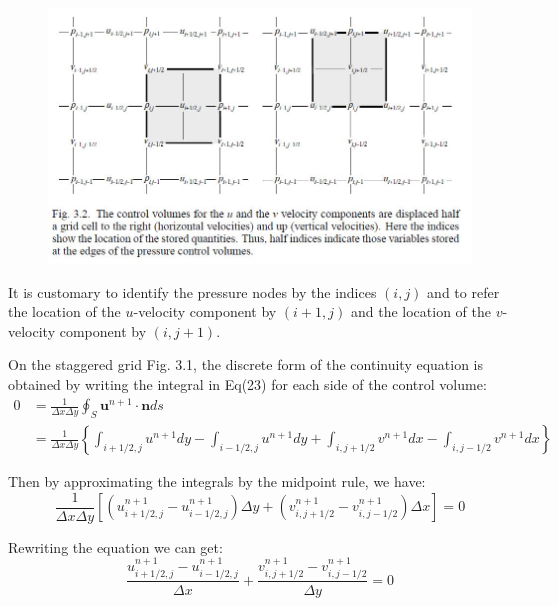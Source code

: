 \documentclass[11pt]{article} %
\begin{document}
\begin{figure}[h]
\includegraphics[scale=0.6]{staggered mesh 3.2.JPG}
\centering
\end{figure}
\par
It is customary to identify the pressure nodes by the indices $(i, j)$ and to refer the location of the $u$-velocity component by $(i+1, j)$ and the location of the $v$-velocity component by $(i, j+1)$. \par
On the staggered grid Fig. 3.1, the discrete form of the continuity equation is obtained by writing the integral in Eq(23) for each side of the control volume:
\begin{equation}
\begin{aligned}
0 &=\frac{1}{\Delta x\Delta y} \oint_{S} \textbf{u}^{n+1} \cdot \textbf{n} ds \\ 
&= \frac{1}{\Delta x\Delta y} \left\{
\int_{i+1/2, j} u^{n+1}dy -\int_{i-1/2, j} u^{n+1}dy+\int_{i, j+1/2} v^{n+1}dx-\int_{i, j-1/2} v^{n+1}dx
 \right\}
\end{aligned}
\end{equation}\par
Then by approximating the integrals by the midpoint rule, we have:
\begin{equation}
\frac{1}{\Delta x\Delta y} \left[\left(u_{i+1/2, j}^{n+1}-u_{i-1/2, j}^{n+1}\right)\Delta y +\left(v_{i, j+1/2}^{n+1}-v_{i, j-1/2}^{n+1}\right)\Delta x\right] = 0
\end{equation}\par
Rewriting the equation we can get:
\begin{equation}
\frac{u_{i+1/2, j}^{n+1}-u_{i-1/2, j}^{n+1}}{\Delta x}+\frac{v_{i, j+1/2}^{n+1}-v_{i, j-1/2}^{n+1}}{\Delta y} = 0
\end{equation}\par
\end{document}
